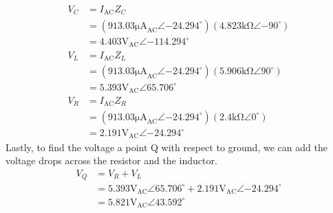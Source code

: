 \documentclass[12pt,a4paper,titlepage]{article}
\begin{document}
\begin{align*}
  V_C &= I_\text{AC}Z_C \\
  &= (913.03\si{\micro \ampere}_\text{AC} \angle {-24.294}^{\circ})(4.823\si{\kilo \ohm} \angle {-90}^{\circ}) \\
  &= 4.403\si{\volt}_\text{AC} \angle {-114.294}^{\circ} \\
  V_L &= I_\text{AC}Z_L \\
  &= (913.03\si{\micro \ampere}_\text{AC} \angle {-24.294}^{\circ})(5.906\si{\kilo \ohm} \angle 90^{\circ}) \\
  &= 5.393\si{\volt}_\text{AC} \angle 65.706^{\circ} \\
  V_R &= I_\text{AC}Z_R \\
  &= (913.03\si{\micro \ampere}_\text{AC} \angle {-24.294}^{\circ})(2.4\si{\kilo \ohm} \angle 0^{\circ}) \\
  &= 2.191\si{\volt}_\text{AC} \angle {-24.294}^{\circ}
\end{align*}
Lastly, to find the voltage a point Q with respect to ground, we can add the voltage drops across the resistor and the inductor.
\begin{align*}
  V_Q &= V_R + V_L \\
  &= 5.393\si{\volt}_\text{AC} \angle 65.706^{\circ} + 2.191\si{\volt}_\text{AC} \angle {-24.294}^{\circ} \\
  &= 5.821\si{\volt}_\text{AC} \angle 43.592^{\circ}
\end{align*}
\end{document}
